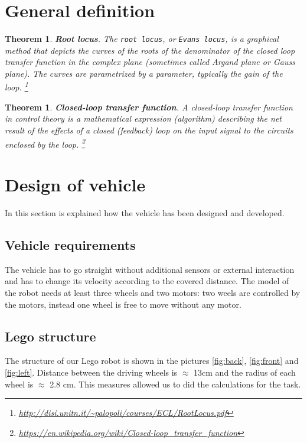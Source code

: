 \documentclass[a4paper,12pt,oneside]{article}
\newtheorem{thm}[equation]{Theorem}
\begin{document}
\section{General definition}
\begin{thm}
\textbf{Root locus}. The \texttt{root locus}, or \texttt{Evans locus}, is a graphical method that
depicts the curves of the roots of the denominator of the closed loop transfer function in the complex plane
(sometimes called Argand plane or Gauss plane). The curves are parametrized by a parameter, typically the
gain of the loop.  \footnote{\url{http://disi.unitn.it/~palopoli/courses/ECL/RootLocus.pdf}}
\end{thm}
\begin{thm}
\textbf{Closed-loop transfer function}. A closed-loop transfer function in control theory is a mathematical expression (algorithm) describing the net result of the effects of a closed (feedback) loop on the input signal to the circuits enclosed by the loop. \footnote{\url{https://en.wikipedia.org/wiki/Closed-loop_transfer_function}}
\end{thm}

\section{Design of vehicle}
In this section is explained how the vehicle has been designed and developed.
\subsection{Vehicle requirements}
The vehicle has to go straight without additional sensors or external interaction and has to change its velocity according to the covered distance. The model of the robot needs at least three wheels and two motors: two weels are controlled by the motors, instead one wheel is free to move without any motor. 
\subsection{Lego structure}
The structure of our Lego robot is shown in the pictures \cref{fig:back}, \cref{fig:front} and \cref{fig:left}. Distance between the driving wheels is $\approx$ 13cm and the radius of each wheel is $\approx$ 2.8 cm. This measures allowed us to did the calculations for the task.
\end{document}
